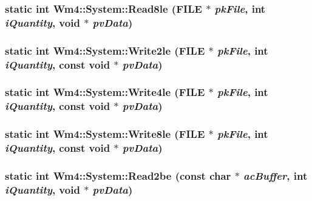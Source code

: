 \subsubsection{\setlength{\rightskip}{0pt plus 5cm}static int Wm4::System::Read8le (FILE $\ast$ {\em pk\-File}, int {\em i\-Quantity}, void $\ast$ {\em pv\-Data})\hspace{0.3cm}{\tt  [static]}}\label{classWm4_1_1System_66b7a25e5e0371fdd8b7fe9865178062}


\subsubsection{\setlength{\rightskip}{0pt plus 5cm}static int Wm4::System::Write2le (FILE $\ast$ {\em pk\-File}, int {\em i\-Quantity}, const void $\ast$ {\em pv\-Data})\hspace{0.3cm}{\tt  [static]}}\label{classWm4_1_1System_275fc9aed7d3612cec1d478479276881}


\subsubsection{\setlength{\rightskip}{0pt plus 5cm}static int Wm4::System::Write4le (FILE $\ast$ {\em pk\-File}, int {\em i\-Quantity}, const void $\ast$ {\em pv\-Data})\hspace{0.3cm}{\tt  [static]}}\label{classWm4_1_1System_6538bb9a6eb49b0c8943fccc5ddc6043}


\subsubsection{\setlength{\rightskip}{0pt plus 5cm}static int Wm4::System::Write8le (FILE $\ast$ {\em pk\-File}, int {\em i\-Quantity}, const void $\ast$ {\em pv\-Data})\hspace{0.3cm}{\tt  [static]}}\label{classWm4_1_1System_f2407893730726f21d896686b902fb4e}


\subsubsection{\setlength{\rightskip}{0pt plus 5cm}static int Wm4::System::Read2be (const char $\ast$ {\em ac\-Buffer}, int {\em i\-Quantity}, void $\ast$ {\em pv\-Data})\hspace{0.3cm}{\tt  [static]}}\label{classWm4_1_1System_54471c1acd0185a2169f39c1f04e2117}


